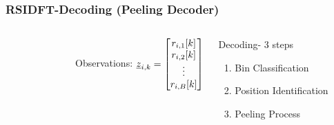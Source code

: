 \begin{frame}\frametitle{RSIDFT-Decoding (Peeling Decoder)}
\begin{columns}
		\begin{figure}[h!]
			\begin{center}
				\resizebox{1.0\textwidth}{!}{}	
			\end{center}	
		\end{figure}
	    \begin{block}{Observations:}
	          $
	    		\underline{z}_{i,k} = \begin{bmatrix}
	    		r_{i,1}[k]\\
	    		r_{i,2}[k]\\
	    		\vdots\\
	    		r_{i,B}[k]
	    		\end{bmatrix}
	    		$
	    	\end{block}
	    	\begin{block}{Decoding- 3 steps}	
	    		\begin{enumerate}
	    			\item Bin Classification
	    			\item Position Identification
	    			\item Peeling Process
	    		\end{enumerate}
	
	    \end{block}
	
		
\end{columns}	
\end{frame}

